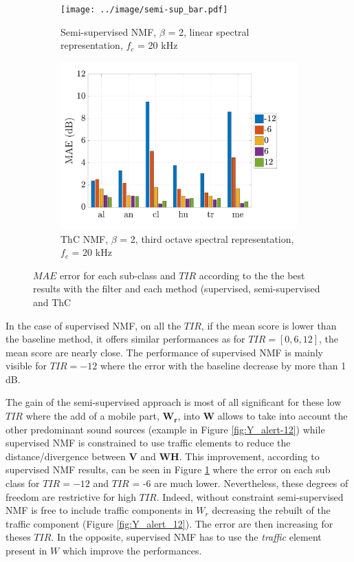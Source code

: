 \documentclass[twocolumn,a4paper,10pt]{article}
\begin{document}
\begin{figure}[t!]
    \begin{subfigure}[t]{0.45\textwidth}
        \centering
        \texttt{[image: ../image/semi-sup\_bar.pdf]}
        \caption{Semi-supervised NMF, $\beta$ = 2, linear spectral representation, $f_c$ = 20 kHz}
                \label{fig:TIR_class_semi}
    \end{subfigure}%
    \hfill 
    \begin{subfigure}[t]{0.45\textwidth}
        \centering
        \includegraphics[width=\linewidth]{../image/THC_bar}
        \caption{ThC NMF, $\beta$ = 2, third octave spectral representation, $f_c$ = 20 kHz}
        \label{fig:TIR_class_thc}
    \end{subfigure}
    \caption{$MAE$ error for each sub-class and $TIR$ according to the the best results with the filter and each method (supervised, semi-supervised and ThC}
\end{figure}


In the case of supervised NMF, on all the $TIR$, if the mean score is lower than the baseline method, it offers similar performances as for $TIR = [0, 6, 12]$, the mean score are nearly close. The performance of supervised NMF is mainly visible for $TIR = -12$ where the error with the baseline decrease by more than 1 dB. 

The gain of the semi-supervised approach is most of all significant for these low $TIR$ where the add of a mobile part, $\mathbf{W_r}$, into $\mathbf{W}$ allows to take into account the other predominant sound sources (example in Figure \ref{fig:Y_alert-12}) while supervised NMF is constrained to use traffic elements to reduce the distance/divergence between $\mathbf{V}$ and $\mathbf{WH}$. This improvement, according to supervised NMF results, can be seen in Figure \ref{fig:TIR_class_semi} where the error on each sub class for $TIR = -12$ and $TIR$ = -6 are much lower.  Nevertheless, these degrees of freedom are restrictive for high $TIR$. Indeed, without constraint semi-supervised NMF is free to include traffic components in $W_r$ decreasing the rebuilt of the traffic component (Figure \ref{fig:Y_alert_12}). The error are then increasing for theses $TIR$. In the opposite, supervised NMF has to use the \textit{traffic} element present in $W$ which improve the performances. 
\end{document}
